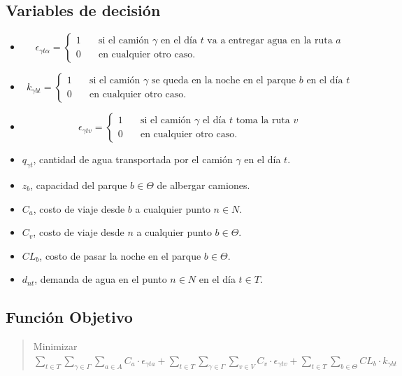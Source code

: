 \documentclass[addpoints,10pt]{exam}
\begin{document}
\begin{flushleft}
		\subsection{Variables de decisión} 
		\begin{itemize}
			\item \[
				\epsilon_{\gamma t\alpha} = 
					 \begin{cases}
					   1 &\quad\text{si el camión }\gamma\text{ en el día }t\text{ va a entregar agua en la ruta }a\\
					   0 & \quad\text{en cualquier otro caso.}
					 \end{cases}
				\]
			\item \[
				k_{\gamma b t} = 
					 \begin{cases}
					   1 &\quad\text{si el camión }\gamma\text{ se queda en la noche en el parque }b\text{ en el día }t\\
					   0 &\quad\text{en cualquier otro caso.}
					 \end{cases}
				\]
				
			\item \[
				\epsilon_{\gamma t v} = 
					 \begin{cases}
					   1 &\quad\text{si el camión }\gamma\text{ el día }t\text{ toma la ruta }v\\
					   0 &\quad\text{en cualquier otro caso.}
					 \end{cases}
				\]
			\item $q_{\gamma t}$, cantidad de agua transportada por el camión $\gamma$ en el día $t$.
			\item $z_{b}$, capacidad del parque $b \in \Theta$ de albergar camiones.
			\item $C_{a}$, costo de viaje desde $b$ a cualquier punto $n \in N$.
			\item $C_{v}$, costo de viaje desde $n$ a cualquier punto $b \in \Theta$. 
			\item $CL_{b}$, costo de pasar la noche en el parque $b \in \Theta$.
			\item  $d_{nt}$, demanda de agua en el punto $n \in N$ en el día $t \in T$.
		\end{itemize}

		\subsection{Función Objetivo}
		\begin{quote}
			\begin{center}
				Minimizar $\sum\limits_{t \in T}\sum\limits_{\gamma \in \Gamma}\sum\limits_{a \in A} C_{a} \cdot \epsilon_{\gamma t a} + \sum\limits_{t \in T}\sum\limits_{\gamma \in \Gamma}\sum\limits_{v \in V} C_{v} \cdot \epsilon_{\gamma t v} + \sum\limits_{t \in T}\sum\limits_{b \in \Theta} CL_{b} \cdot k_{\gamma b t}$	
			\end{center}
		\end{quote}


\end{flushleft}
\end{document}
